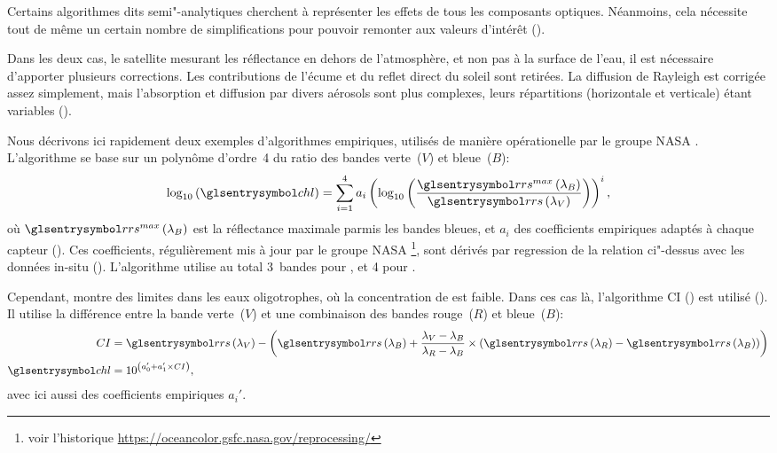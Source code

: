 Certains algorithmes dits semi"-analytiques cherchent à représenter les effets de tous les composants optiques.
Néanmoins, cela nécessite tout de même un certain nombre de simplifications pour pouvoir remonter aux valeurs d'intérêt (\cite{werdell_2018, werdell_2019}).

Dans les deux cas, le satellite mesurant les réflectance en dehors de l'atmosphère, et non pas à la surface de l'eau, il est nécessaire d'apporter plusieurs corrections.
Les contributions de l'écume et du reflet direct du soleil sont retirées.
La diffusion de Rayleigh est corrigée assez simplement, mais l'absorption et diffusion par divers aérosols sont plus complexes, leurs répartitions (horizontale et verticale) étant variables (\cite{werdell_2018}).

Nous décrivons ici rapidement deux exemples d'algorithmes empiriques, utilisés de manière opérationelle par le groupe NASA .
L'algorithme  se base sur un polynôme d'ordre~4 du ratio des bandes verte~(\(V\)) et bleue~(\(B\)):
\begin{equation} \label{eq:ocx}
  \log_{10}\paren{\am{chl}} =
  \sum_{i=1}^{4} a_i \paren{\log_{10}\paren{
      \frac{ \am{rrs}^{max}\paren{\lambda_B} }
           { \am{rrs}\paren{\lambda_V} }
    }}^i ,
\end{equation}
où \(\am{rrs}^{max}\paren{\lambda_B}\) est la réflectance maximale parmis les bandes bleues, et \(a_i\) des coefficients empiriques adaptés à chaque capteur (\cite{oreilly_1998, oreilly_2000}).
Ces coefficients, régulièrement mis à jour par le groupe NASA \footnote{voir l'historique \url{https://oceancolor.gsfc.nasa.gov/reprocessing/}}, sont dérivés par regression de la relation ci"-dessus avec les données in-situ  (\cite{werdell_2005}).
L'algorithme utilise au total 3~bandes pour , et 4 pour .

Cependant,  montre des limites dans les eaux oligotrophes, où la concentration de  est faible.
Dans ces cas là, l'algorithme CI () est utilisé (\cite{hu_2012}).
Il utilise la différence entre la bande verte~(\(V\)) et une combinaison des bandes rouge~(\(R\)) et bleue~(\(B\)):
\begin{equation}
  \label{eq:CI}
  \begin{split}
    CI &= \am{rrs}\paren{\lambda_V} -
         \paren{
          \am{rrs}\paren{\lambda_B}
          + \frac {\lambda_V - \lambda_B}
                  {\lambda_R - \lambda_B}
          \times \paren{\am{rrs}\paren{\lambda_R}
                      - \am{rrs}\paren{\lambda_B}}
         }
    \\
    \am{chl} &= 10^{\paren{a_0' + a_1' \times CI}},
  \end{split}
\end{equation}
avec ici aussi des coefficients empiriques \(a_i'\).

